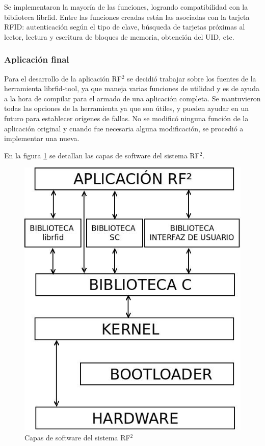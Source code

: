 \documentclass[%
        final,
        notitlepage,
        narroweqnarray,
        inline,
        ]{ieee}
\begin{document}
Se implementaron la mayoría de las funciones, logrando compatibilidad con la biblioteca librfid. Entre las funciones creadas están las asociadas con la tarjeta RFID: autenticación según el tipo de clave, búsqueda de tarjetas próximas al lector, lectura y escritura de bloques de memoria, obtención del UID, etc.

\subsubsection{Aplicación final}

Para el desarrollo de la aplicación RF$^{2}$ se decidió trabajar sobre los fuentes de la herramienta librfid-tool, ya que maneja varias funciones de utilidad y es de ayuda a la hora de compilar para el armado de una aplicación completa. Se mantuvieron todas las opciones de la herramienta ya que son útiles, y pueden ayudar en un futuro para establecer orígenes de fallas. No se modificó ninguna función de la aplicación original y cuando fue necesaria alguna modificación, se procedió a implementar una nueva.

En la figura \ref{Fig:SW} se detallan las capas de software del sistema RF$^{2}$.

\begin{figure}[h]
\centering
  \begin{center}
  \includegraphics[scale=.35]{../docs/Imagenes/SW.jpg} 
  \end{center}
  \caption{Capas de software del sistema RF${^{2}}$}\label{Fig:SW} 
\end{figure}
\end{document}
